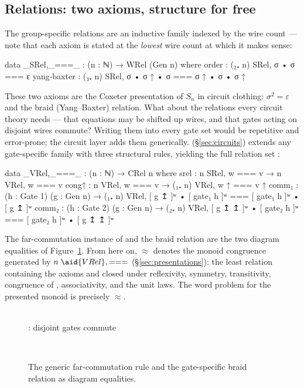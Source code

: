 \subsection{Relations: two axioms, structure for free}

The group-specific relations are an inductive family indexed by the wire
count --- note that each axiom is stated at the \emph{lowest} wire count at
which it makes sense:

\begin{agdacode}
data _SRel,_===_ : (n : ℕ) → WRel (Gen n) where
  order       : (₂₊ n) SRel, σ • σ === ε
  yang-baxter : (₃₊ n) SRel, σ • σ ↑ • σ === σ ↑ • σ • σ ↑
\end{agdacode}

These two axioms are the Coxeter presentation of $S_n$ in circuit clothing:
$\sigma^2 = \varepsilon$ and the braid (Yang--Baxter) relation.  What about
the relations every circuit theory needs --- that equations may be shifted
up wires, and that gates acting on disjoint wires commute?  Writing them
into every gate set would be repetitive and error-prone; the circuit layer
adds them generically.   (\S\ref{sec:circuits}) extends
any gate-specific family with three structural rules, yielding the full
relation set :

\begin{agdacode}
data _VRel,_===_ : (n : ℕ) → CRel n where
  srel  : n SRel, w === v → n VRel, w === v
  cong↑ : n VRel, w === v → (₁₊ n) VRel, w ↑ === v ↑
  comm₁ : (h : Gate 1) (g : Gen n) → (₁₊ n) VRel,
    [ g ↥ ]ʷ • [ gate₁ h ]ʷ === [ gate₁ h ]ʷ • [ g ↥ ]ʷ
  comm₂ : (h : Gate 2) (g : Gen n) → (₂₊ n) VRel,
    [ g ↥ ↥ ]ʷ • [ gate₂ h ]ʷ === [ gate₂ h ]ʷ • [ g ↥ ↥ ]ʷ
\end{agdacode}

The far-commutation instance of  and the braid relation are the
two diagram equalities of Figure~\ref{fig:relations}.  From here on,
$\approx$ denotes the monoid congruence generated by
$n\;\aid{VRel},{=}{=}{=}$ (\S\ref{sec:presentations}): the least relation
containing the axioms and closed under reflexivity, symmetry, transitivity,
congruence of , associativity, and the unit laws.  The word problem
for the presented monoid is precisely $\approx$.

\begin{figure}[h]
\centering
\begin{minipage}[c]{0.41\linewidth}\centering
{}\\[2pt]
{\small {}: disjoint gates commute}
\end{minipage}\hfill
\begin{minipage}[c]{0.55\linewidth}\centering
{}\\[2pt]
{\small {}}
\end{minipage}
\caption{The generic far-commutation rule and the gate-specific braid
relation as diagram equalities.}
\label{fig:relations}
\end{figure}

